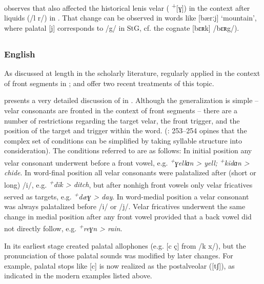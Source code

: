 \citet[108, Footnote 27]{Riad2014} observes that  also affected the historical lenis velar ( \textsuperscript{+}[ɣ]) in the context after liquids (/l r/) in . That change can be observed in  words like [bærːj] ‘mountain’, where palatal [j] corresponds to /g/ in StG, cf. the cognate [bɛʀk] /bɛʀg/).

\subsection{}

\subsubsection{English}
\begin{sloppypar}
As discussed at length in the scholarly literature,  regularly applied in the context of front segments in ; \citet[252--270]{Hogg2011} and \citet[84--88]{Minkova2014} offer two recent treatments of this topic.
\end{sloppypar}

\citet[252--270]{Hogg2011} presents a very detailed discussion of  in . Although the generalization is simple -- velar consonants are fronted in the context of front segments -- there are a number of restrictions regarding the target velar, the front  trigger, and the position of the target and trigger within the word. (\citealt{Hogg2011}: 253--254 opines that the complex set of conditions can be simplified by taking syllable structure into consideration). The conditions referred to are as follows: In initial position any velar consonant underwent  before a front vowel, e.g. \textit{\textsuperscript{+}}\textit{ɣellɑn > yell; \textsuperscript{+}}\textit{kīdɑn > chide}. In word-final position all velar consonants were palatalized after (short or long) /i/, e.g. \textit{\textsuperscript{+}}\textit{dīk > ditch}, but after nonhigh front vowels only velar fricatives served as targets, e.g. \textit{\textsuperscript{+}}\textit{dæɣ > day}. In word-medial position a velar consonant was always palatalized before /i/ or /j/. Velar fricatives underwent the same change in medial position after any front vowel provided that a back vowel did not directly follow, e.g. \textit{\textsuperscript{+}}\textit{reɣn > rain}.

In its earliest stage  created palatal allophones (e.g. [c ç] from /k x/), but the pronunciation of those palatal sounds was modified by later changes. For example, palatal stops like [c] is now realized as the postalveolar  ([tʃ]), as indicated in the modern  examples listed above.

